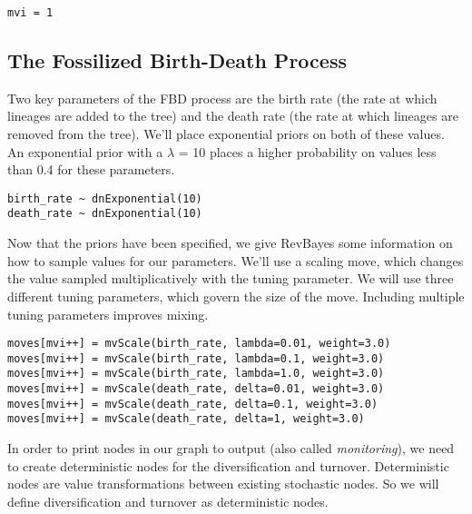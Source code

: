 {\tt \begin{snugshade*}
\begin{lstlisting}
mvi = 1
\end{lstlisting}
\end{snugshade*}}

\bigskip

\subsection{The Fossilized Birth-Death Process}

Two key parameters of the FBD process are the birth rate (the rate at which lineages are added to the tree) and the death rate (the rate at which lineages are removed from the tree). We'll place exponential priors on both of these values. An exponential prior with a $\lambda$ =  10 places a higher probability on values less than 0.4 for these parameters. 

{\tt \begin{snugshade*}
\begin{lstlisting}
birth_rate ~ dnExponential(10)
death_rate ~ dnExponential(10)
\end{lstlisting}
\end{snugshade*}}

Now that the priors have been specified, we give RevBayes some information on how to sample values for our parameters. We'll use a scaling move, which changes the value sampled multiplicatively with the tuning parameter. We will use three different tuning parameters, which govern the size of the move. Including multiple tuning parameters improves mixing. 

{\tt \begin{snugshade*}
\begin{lstlisting}
moves[mvi++] = mvScale(birth_rate, lambda=0.01, weight=3.0)
moves[mvi++] = mvScale(birth_rate, lambda=0.1, weight=3.0)
moves[mvi++] = mvScale(birth_rate, lambda=1.0, weight=3.0)
moves[mvi++] = mvScale(death_rate, delta=0.01, weight=3.0)
moves[mvi++] = mvScale(death_rate, delta=0.1, weight=3.0)
moves[mvi++] = mvScale(death_rate, delta=1, weight=3.0)
\end{lstlisting}
\end{snugshade*}}

In order to print nodes in our graph to output (also called \textit{monitoring}), we need to create deterministic nodes for the diversification and turnover. Deterministic nodes are value transformations between existing stochastic nodes. So we will define diversification and turnover as deterministic nodes.

